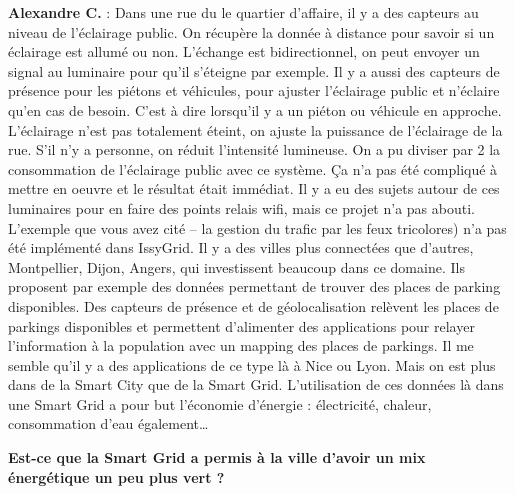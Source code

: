 \textbf{Alexandre C.} :
Dans une rue du le quartier d’affaire, il y a des capteurs au niveau de l’éclairage public.
On récupère la donnée à distance pour savoir si un éclairage est allumé ou non.
L’échange est bidirectionnel, on peut envoyer un signal au luminaire pour qu’il s’éteigne par exemple.
Il y a aussi des capteurs de présence pour les piétons et véhicules, pour ajuster l’éclairage public et n’éclaire qu’en cas de besoin.
C’est à dire lorsqu’il y a un piéton ou véhicule en approche.
L’éclairage n’est pas totalement éteint, on ajuste la puissance de l’éclairage de la rue.
S’il n’y a personne, on réduit l’intensité lumineuse.
On a pu diviser par 2 la consommation de l’éclairage public avec ce système.
Ça n’a pas été compliqué à mettre en oeuvre et le résultat était immédiat.
Il y a eu des sujets autour de ces luminaires pour en faire des points relais wifi, mais ce projet n’a pas abouti.
L'exemple que vous avez cité – la gestion du trafic par les feux tricolores) n’a pas été implémenté dans IssyGrid.
Il y a des villes plus connectées que d’autres, Montpellier, Dijon, Angers, qui investissent beaucoup dans ce domaine.
Ils proposent par exemple des données permettant de trouver des places de parking disponibles.
Des capteurs de présence et de géolocalisation relèvent les places de parkings disponibles
et permettent d’alimenter des applications pour relayer l’information à la population avec un mapping des places de parkings.
Il me semble qu’il y a des applications de ce type là à Nice ou Lyon.
Mais on est plus dans de la Smart City que de la Smart Grid.
L’utilisation de ces données là dans une Smart Grid a pour but l’économie d'énergie :
électricité, chaleur, consommation d’eau également\dots

\textbf{Est-ce que la Smart Grid a permis à la ville d’avoir un mix énergétique un peu plus vert ?}

